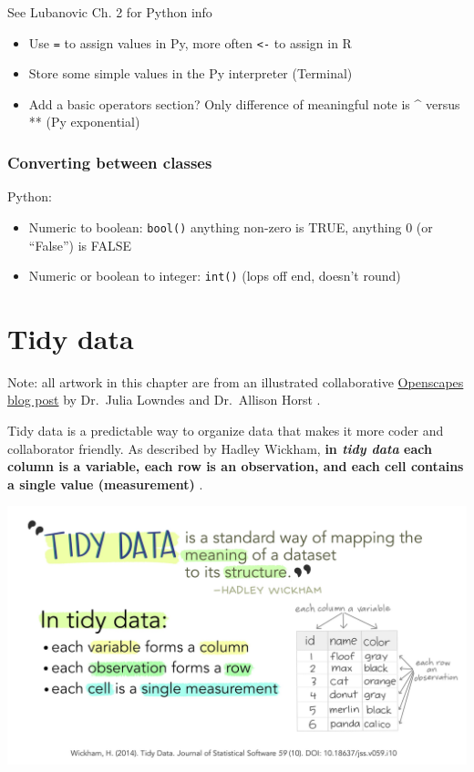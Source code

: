 \documentclass[
]{book}
\providecommand{\tightlist}{%
  \setlength{\itemsep}{0pt}\setlength{\parskip}{0pt}}
\begin{document}
See Lubanovic Ch. 2 for Python info

\begin{itemize}
\item
  Use \texttt{=} to assign values in Py, more often \texttt{\textless{}-} to assign in R
\item
  Store some simple values in the Py interpreter (Terminal)
\item
  Add a basic operators section? Only difference of meaningful note is \^{} versus ** (Py exponential)
\end{itemize}

\hypertarget{converting-between-classes}{%
\subsection{Converting between classes}\label{converting-between-classes}}

Python:

\begin{itemize}
\tightlist
\item
  Numeric to boolean: \texttt{bool()} anything non-zero is TRUE, anything 0 (or ``False'') is FALSE
\item
  Numeric or boolean to integer: \texttt{int()} (lops off end, doesn't round)
\end{itemize}

\hypertarget{tidydata}{%
\chapter{Tidy data}\label{tidydata}}

Note: all artwork in this chapter are from an illustrated collaborative \href{https://www.openscapes.org/blog/2020/10/12/tidy-data/}{Openscapes blog post} by Dr.~Julia Lowndes and Dr.~Allison Horst \citep{lowndes_tidy_2020}.

Tidy data is a predictable way to organize data that makes it more coder and collaborator friendly. As described by Hadley Wickham, \textbf{in \emph{tidy data} each column is a variable, each row is an observation, and each cell contains a single value (measurement)} \citep{wickham_tidy_2014}.

\includegraphics[width=6.25in,height=\textheight]{images/tidydata_1.jpg}
\end{document}
